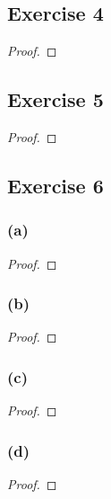 \documentclass[14pt]{extarticle}
\begin{document}
\subsection{Exercise 4}

\begin{proof}

\end{proof}

\subsection{Exercise 5}

\begin{proof}

\end{proof}

\subsection{Exercise 6}

\subsubsection{(a)}

\begin{proof}

\end{proof}

\subsubsection{(b)}

\begin{proof}

\end{proof}

\subsubsection{(c)}

\begin{proof}

\end{proof}

\subsubsection{(d)}

\begin{proof}

\end{proof}
\end{document}
